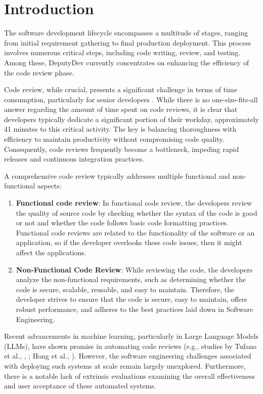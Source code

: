 \section{Introduction}
The software development lifecycle encompasses a multitude of stages, ranging from initial requirement gathering to final production deployment. This process involves numerous critical steps, including code writing, review, and testing. Among these, DeputyDev currently concentrates on enhancing the efficiency of the code review phase.

Code review, while crucial, presents a significant challenge in terms of time consumption, particularly for senior developers \cite{Vijayvergiya_2024}. While there is no one-size-fits-all answer regarding the amount of time spent on code reviews, it is clear that developers typically dedicate a significant portion of their workday, approximately 41 minutes \cite{softwareCodeTime} to this critical activity. The key is balancing thoroughness with efficiency to maintain productivity without compromising code quality. Consequently, code reviews frequently become a bottleneck, impeding rapid releases and continuous integration practices.

A comprehensive code review typically addresses multiple functional and non-functional aspects:

\begin{enumerate}
    \item \textbf{Functional code review}: In functional code review, the developers review the quality of source code by checking whether the syntax of the code is good or not and whether the code follows basic code formatting practices. Functional code reviews are related to the functionality of the software or an application, so if the developer overlooks these code issues, then it might affect the applications.

    \item \textbf{Non-Functional Code Review}: While reviewing the code, the developers analyze the non-functional requirements, such as determining whether the code is secure, scalable, reusable, and easy to maintain. Therefore, the developer strives to ensure that the code is secure, easy to maintain, offers robust performance, and adheres to the best practices laid down in Software Engineering.

\end{enumerate}

Recent advancements in machine learning, particularly in Large Language Models (LLMs), have shown promise in automating code reviews (e.g., studies by Tufano et al.,  \cite{tufano2024codereviewautomationstrengths},  \cite{tufano2022usingpretrainedmodelsboost}; Hong et al., \cite{10.1145/3540250.3549119}). However, the software engineering challenges associated with deploying such systems at scale remain largely unexplored. Furthermore, there is a notable lack of extrinsic evaluations examining the overall effectiveness and user acceptance of these automated systems.

